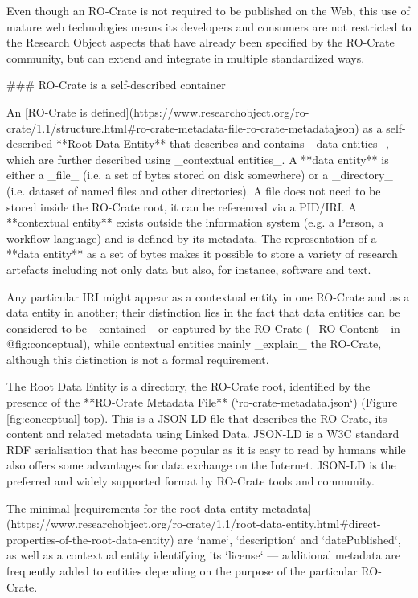 {Even though an RO-Crate is not required to be published on the Web, this use of mature web technologies means its developers and consumers are not restricted to the Research Object aspects that have already been specified by the RO-Crate community, but can extend and integrate in multiple standardized ways. 


### RO-Crate is a self-described container

An [RO-Crate is defined](https://www.researchobject.org/ro-crate/1.1/structure.html#ro-crate-metadata-file-ro-crate-metadatajson) as a self-described **Root Data Entity** that describes and contains _data entities_, which are further described using _contextual entities_.  A **data entity** is either a _file_ (i.e. a set of bytes stored on disk somewhere) or a _directory_ (i.e. dataset of named files and other directories). A file does not need to be stored inside the RO-Crate root, it can be referenced via a PID/IRI. A **contextual entity** exists outside the information system (e.g. a Person, a workflow language) and is defined by its metadata. The representation of a **data entity** as a set of bytes makes it possible to store a variety of research artefacts including not only data but also, for instance, software and text.

Any particular IRI might appear as a contextual entity in one RO-Crate and as a data entity in another; their distinction lies in the fact that data entities can be considered to be _contained_ or captured by the RO-Crate (_RO Content_ in {@fig:conceptual}), while contextual entities mainly _explain_ the RO-Crate, although this distinction is not a formal requirement.

The Root Data Entity is a directory, the RO-Crate root, identified by the presence of the **RO-Crate Metadata File** (`ro-crate-metadata.json`) (Figure \ref{fig:conceptual} top). This is a JSON-LD file that describes the RO-Crate, its content and related metadata using Linked Data. JSON-LD is a W3C standard RDF serialisation that has become popular as it is easy to read by humans while also offers some advantages for data exchange on the Internet. JSON-LD is the preferred and widely supported format by RO-Crate tools and community.

The minimal [requirements for the root data entity metadata](https://www.researchobject.org/ro-crate/1.1/root-data-entity.html#direct-properties-of-the-root-data-entity) are `name`, `description` and `datePublished`, as well as a contextual entity identifying its `license` — additional metadata are frequently added to entities depending on the purpose of the particular RO-Crate.

}
